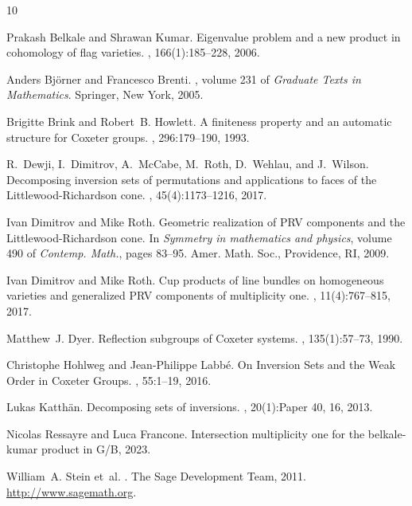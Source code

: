 \begin{thebibliography}{10}

Prakash Belkale and Shrawan Kumar.
\newblock Eigenvalue problem and a new product in cohomology of flag varieties.
, 166(1):185--228, 2006.

Anders Bj\"{o}rner and Francesco Brenti.
, volume 231 of {\em Graduate
  Texts in Mathematics}.
\newblock Springer, New York, 2005.

Brigitte Brink and Robert~B. Howlett.
\newblock A finiteness property and an automatic structure for {C}oxeter
  groups.
, 296:179--190, 1993.

R.~Dewji, I.~Dimitrov, A.~McCabe, M.~Roth, D.~Wehlau, and J.~Wilson.
\newblock Decomposing inversion sets of permutations and applications to faces
  of the {L}ittlewood-{R}ichardson cone.
, 45(4):1173--1216, 2017.

Ivan Dimitrov and Mike Roth.
\newblock Geometric realization of {PRV} components and the
  {L}ittlewood-{R}ichardson cone.
\newblock In {\em Symmetry in mathematics and physics}, volume 490 of {\em
  Contemp. Math.}, pages 83--95. Amer. Math. Soc., Providence, RI, 2009.

Ivan Dimitrov and Mike Roth.
\newblock Cup products of line bundles on homogeneous varieties and generalized
  {PRV} components of multiplicity one.
, 11(4):767--815, 2017.

Matthew~J. Dyer.
\newblock Reflection subgroups of {C}oxeter systems.
, 135(1):57--73, 1990.

Christophe Hohlweg and Jean-Philippe Labb\'e.
\newblock On {I}nversion {S}ets and the {W}eak {O}rder in {C}oxeter {G}roups.
, 55:1--19, 2016.

Lukas Katth\"an.
\newblock Decomposing sets of inversions.
, 20(1):Paper 40, 16, 2013.

Nicolas Ressayre and Luca Francone.
\newblock Intersection multiplicity one for the belkale-kumar product in G/B,
  2023.

William~A. Stein et~al.
.
\newblock The Sage Development Team, 2011.
\newblock \url{http://www.sagemath.org}.

\end{thebibliography}
